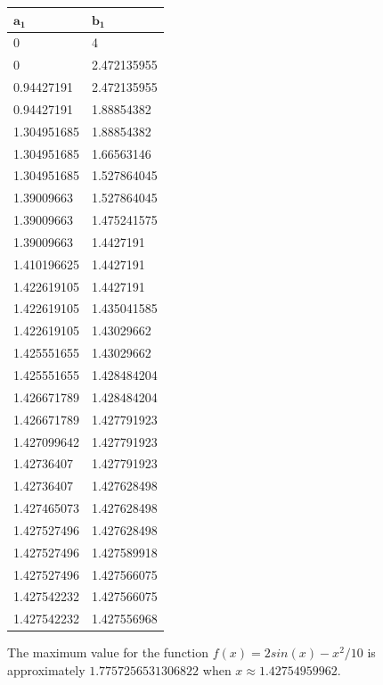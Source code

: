 \documentclass[12pt, letterpaper]{article}
\begin{document}
	\begin{table}[h]
	\centering
	\begin{tabular}{|l|l|}
		\hline
		$\mathbf{a_1}$ & $\mathbf{b_1}$ \\ \hline
		0           & 4           \\ \hline
		0           & 2.472135955 \\ \hline
		0.94427191  & 2.472135955 \\ \hline
		0.94427191  & 1.88854382  \\ \hline
		1.304951685 & 1.88854382  \\ \hline
		1.304951685 & 1.66563146  \\ \hline
		1.304951685 & 1.527864045 \\ \hline
		1.39009663  & 1.527864045 \\ \hline
		1.39009663  & 1.475241575 \\ \hline
		1.39009663  & 1.4427191   \\ \hline
		1.410196625 & 1.4427191   \\ \hline
		1.422619105 & 1.4427191   \\ \hline
		1.422619105 & 1.435041585 \\ \hline
		1.422619105 & 1.43029662  \\ \hline
		1.425551655 & 1.43029662  \\ \hline
		1.425551655 & 1.428484204 \\ \hline
		1.426671789 & 1.428484204 \\ \hline
		1.426671789 & 1.427791923 \\ \hline
		1.427099642 & 1.427791923 \\ \hline
		1.42736407  & 1.427791923 \\ \hline
		1.42736407  & 1.427628498 \\ \hline
		1.427465073 & 1.427628498 \\ \hline
		1.427527496 & 1.427628498 \\ \hline
		1.427527496 & 1.427589918 \\ \hline
		1.427527496 & 1.427566075 \\ \hline
		1.427542232 & 1.427566075 \\ \hline
		1.427542232 & 1.427556968 \\ \hline
	\end{tabular}
	\end{table}
	
	The maximum value for the function $f(x)=2 sin(x)-x^2/10$ is approximately $1.7757256531306822$ when $x\approx1.42754959962$.
\end{document}
